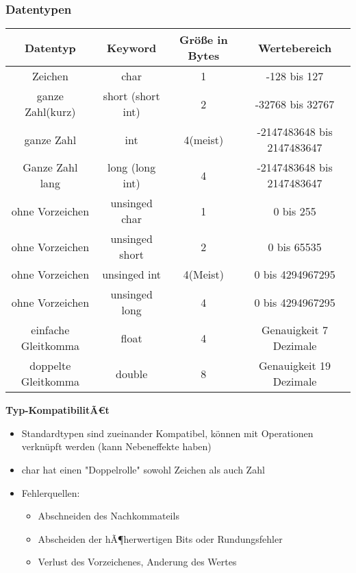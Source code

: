 \documentclass[10pt,a5paper]{article}
\begin{document}
\subsubsection{Datentypen}
\begin{tabular}{|c|c|c|c|}
\hline \rule[-2ex]{0pt}{5.5ex} Datentyp & Keyword & Größe in Bytes & Wertebereich \\ 
\hline \rule[-2ex]{0pt}{5.5ex} Zeichen & char & 1 & -128 bis 127 \\ 
\hline \rule[-2ex]{0pt}{5.5ex} ganze Zahl(kurz) & short (short int) & 2 & -32768 bis 32767 \\ 
\hline \rule[-2ex]{0pt}{5.5ex} ganze Zahl & int & 4(meist) & -2147483648 bis 2147483647 \\ 
\hline \rule[-2ex]{0pt}{5.5ex} Ganze Zahl lang & long (long int) & 4 & -2147483648 bis 2147483647 \\ 
\hline \rule[-2ex]{0pt}{5.5ex} ohne Vorzeichen & unsinged char & 1 & 0 bis 255 \\ 
\hline \rule[-2ex]{0pt}{5.5ex} ohne Vorzeichen & unsinged short & 2 & 0 bis 65535 \\ 
\hline \rule[-2ex]{0pt}{5.5ex} ohne Vorzeichen & unsinged int & 4(Meist) & 0 bis 4294967295  \\ 
\hline \rule[-2ex]{0pt}{5.5ex} ohne Vorzeichen & unsinged long & 4 & 0 bis 4294967295  \\ 
\hline \rule[-2ex]{0pt}{5.5ex} einfache Gleitkomma & float & 4 & Genauigkeit 7 Dezimale  \\ 
\hline \rule[-2ex]{0pt}{5.5ex} doppelte Gleitkomma & double & 8 & Genauigkeit 19 Dezimale  \\
\hline 
\end{tabular}
\textbf{Typ-KompatibilitÃ€t}
\begin{itemize}
\item Standardtypen sind zueinander Kompatibel, können mit Operationen verknüpft werden (kann Nebeneffekte haben)
\item char hat einen "Doppelrolle" sowohl Zeichen als auch Zahl
\item Fehlerquellen: \begin{itemize}
\item Abschneiden des Nachkommateils
\item Abscheiden der hÃ¶herwertigen Bits oder Rundungsfehler
\item Verlust des Vorzeichenes, Anderung des Wertes
\end{itemize}
\end{itemize}
 \newpage
\end{document}
